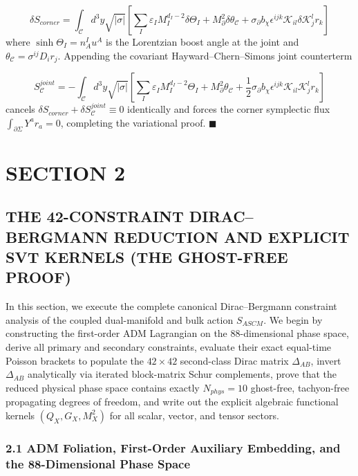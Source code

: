 \documentclass[aps,prd,onecolumn,superscriptaddress,nofootinbib,longbibliography,10pt]{revtex4-2}
\begin{document}
{{  \[ \delta S_{corner} = \int_{\mathcal{C}} d^3y \sqrt{|\sigma|} \left[ \sum_I \varepsilon_I M_I^{d_I - 2}\delta\Theta_I + M_\partial^2 \delta\theta_{\mathcal{C}} + \sigma_\partial b_\chi \epsilon^{ijk}\mathcal{K}_{il}\delta\mathcal{K}^l_j r_k \right] \]
  where \(\sinh\Theta_I = n^I_A u^A\) is the Lorentzian boost angle at the joint and \(\theta_{\mathcal{C}} = \sigma^{ij}D_i r_j\). Appending the covariant Hayward–Chern–Simons joint counterterm


  \[ S_{\mathcal{C}}^{joint} = -\int_{\mathcal{C}} d^3y \sqrt{|\sigma|} \left[ \sum_I \varepsilon_I M_I^{d_I - 2}\Theta_I + M_\partial^2 \theta_{\mathcal{C}} + \frac{1}{2}\sigma_\partial b_\chi \epsilon^{ijk}\mathcal{K}_{il}\mathcal{K}^l_j r_k \right] \]
  cancels \(\delta S_{corner} + \delta S_{\mathcal{C}}^{joint} \equiv 0\) identically and forces the corner symplectic flux \(\int_{\partial\Sigma} Y^a r_a = 0\), completing the variational proof. \(\blacksquare\)




 

  
\section*{SECTION 2}

  
\subsection*{THE 42-CONSTRAINT DIRAC–BERGMANN REDUCTION AND EXPLICIT SVT KERNELS (THE GHOST-FREE PROOF)}

  In this section, we execute the complete canonical Dirac–Bergmann constraint analysis of the coupled dual-manifold and bulk action \(S_{ASCM}\). We begin by constructing the first-order ADM Lagrangian on the 88-dimensional phase space, derive all primary and secondary constraints, evaluate their exact equal-time Poisson brackets to populate the \(42 \times 42\) second-class Dirac matrix \(\Delta_{AB}\), invert \(\Delta_{AB}\) analytically via iterated block-matrix Schur complements, prove that the reduced physical phase space contains exactly \(N_{phys} = 10\) ghost-free, tachyon-free propagating degrees of freedom, and write out the explicit algebraic functional kernels \((Q_X, G_X, M_X^2)\) for all scalar, vector, and tensor sectors.


  
  
\subsubsection*{2.1 ADM Foliation, First-Order Auxiliary Embedding, and the 88-Dimensional Phase Space}

}}
\end{document}
